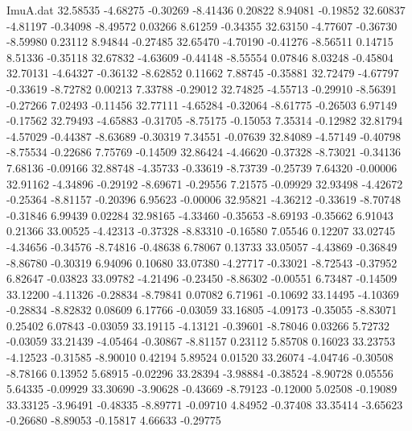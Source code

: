 \begin{filecontents}{ImuA.dat}
  32.58535   -4.68275   -0.30269   -8.41436    0.20822    8.94081   -0.19852
  32.60837   -4.81197   -0.34098   -8.49572    0.03266    8.61259   -0.34355
  32.63150   -4.77607   -0.36730   -8.59980    0.23112    8.94844   -0.27485
  32.65470   -4.70190   -0.41276   -8.56511    0.14715    8.51336   -0.35118
  32.67832   -4.63609   -0.44148   -8.55554    0.07846    8.03248   -0.45804
  32.70131   -4.64327   -0.36132   -8.62852    0.11662    7.88745   -0.35881
  32.72479   -4.67797   -0.33619   -8.72782    0.00213    7.33788   -0.29012
  32.74825   -4.55713   -0.29910   -8.56391   -0.27266    7.02493   -0.11456
  32.77111   -4.65284   -0.32064   -8.61775   -0.26503    6.97149   -0.17562
  32.79493   -4.65883   -0.31705   -8.75175   -0.15053    7.35314   -0.12982
  32.81794   -4.57029   -0.44387   -8.63689   -0.30319    7.34551   -0.07639
  32.84089   -4.57149   -0.40798   -8.75534   -0.22686    7.75769   -0.14509
  32.86424   -4.46620   -0.37328   -8.73021   -0.34136    7.68136   -0.09166
  32.88748   -4.35733   -0.33619   -8.73739   -0.25739    7.64320   -0.00006
  32.91162   -4.34896   -0.29192   -8.69671   -0.29556    7.21575   -0.09929
  32.93498   -4.42672   -0.25364   -8.81157   -0.20396    6.95623   -0.00006
  32.95821   -4.36212   -0.33619   -8.70748   -0.31846    6.99439    0.02284
  32.98165   -4.33460   -0.35653   -8.69193   -0.35662    6.91043    0.21366
  33.00525   -4.42313   -0.37328   -8.83310   -0.16580    7.05546    0.12207
  33.02745   -4.34656   -0.34576   -8.74816   -0.48638    6.78067    0.13733
  33.05057   -4.43869   -0.36849   -8.86780   -0.30319    6.94096    0.10680
  33.07380   -4.27717   -0.33021   -8.72543   -0.37952    6.82647   -0.03823
  33.09782   -4.21496   -0.23450   -8.86302   -0.00551    6.73487   -0.14509
  33.12200   -4.11326   -0.28834   -8.79841    0.07082    6.71961   -0.10692
  33.14495   -4.10369   -0.28834   -8.82832    0.08609    6.17766   -0.03059
  33.16805   -4.09173   -0.35055   -8.83071    0.25402    6.07843   -0.03059
  33.19115   -4.13121   -0.39601   -8.78046    0.03266    5.72732   -0.03059
  33.21439   -4.05464   -0.30867   -8.81157    0.23112    5.85708    0.16023
  33.23753   -4.12523   -0.31585   -8.90010    0.42194    5.89524    0.01520
  33.26074   -4.04746   -0.30508   -8.78166    0.13952    5.68915   -0.02296
  33.28394   -3.98884   -0.38524   -8.90728    0.05556    5.64335   -0.09929
  33.30690   -3.90628   -0.43669   -8.79123   -0.12000    5.02508   -0.19089
  33.33125   -3.96491   -0.48335   -8.89771   -0.09710    4.84952   -0.37408
  33.35414   -3.65623   -0.26680   -8.89053   -0.15817    4.66633   -0.29775

\end{filecontents}
